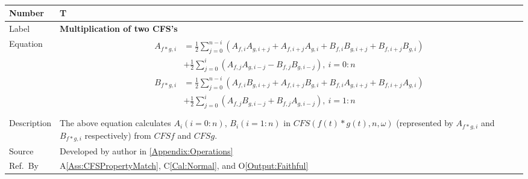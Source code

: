 \documentclass[12pt]{article}
\newcommand{\colAwidth}{0.13\textwidth}
\newcommand{\colBwidth}{0.82\textwidth}
\newcounter{theorynum} %
\newcommand{\aref}[1]{A\ref{#1}}
\newcommand{\calref}[1]{C\ref{#1}}
\newcommand{\oref}[1]{O\ref{#1}}
\begin{document}
~\newline

\noindent
\begin{minipage}{\textwidth}
	\renewcommand*{\arraystretch}{1.5}
	\begin{tabular}{| p{\colAwidth} | p{\colBwidth}|}
		\hline
		\rowcolor[gray]{0.9}
		Number& T{theorynum}\thetheorynum \label{T:Multiplication}\\
		\hline
		Label&\bf Multiplication of two CFS's\\
		\hline
		Equation&  
		\begin{equation}
		\begin{aligned}
		A_{f*g, i}&=\frac{1}{2}\sum_{j=0}^{n-i}(A_{f,i}A_{g,i+j}
		+A_{f, i+j}A_{g, i}+B_{f,i}B_{g,i+j}+B_{f,i+j}B_{g,i})\\
		&+\frac{1}{2}\sum_{j=0}^{i}(A_{f,j}A_{g,i-j}-B_{f,j}B_{g,i-j}),
		~i=0:n\\
		B_{f*g, i}&=\frac{1}{2}\sum_{j=0}^{n-i}(A_{f,i}B_{g,i+j}
		+A_{f, i+j}B_{g, i}+B_{f,i}A_{g,i+j}+B_{f,i+j}A_{g,i})\\
		&+\frac{1}{2}\sum_{j=0}^{i}(A_{f,j}B_{g,i-j}+B_{f,j}A_{g,i-j}),
		~i=1:n\\
		\end{aligned}
		\end{equation}\\
		\hline
		Description & The above equation calculates $A_i(i=0:n)$, 
		$B_i(i=1:n)$ in $\mathit{CFS}(f(t)*g(t), n, \omega)$ 
		(represented by $A_{f*g, i}$ and $B_{f*g, i}$ respectively) 
		from $\mathit{CFSf}$ and $\mathit{CFSg}$.\\
		\hline
		Source & Developed by author in \autoref{Appendix:Operations}\\
		\hline
		Ref.\ By & \aref{Ass:CFSPropertyMatch}, \calref{Cal:Normal}, 
		and \oref{Output:Faithful}\\
		\hline
	\end{tabular}
\end{minipage}\\
\end{document}

